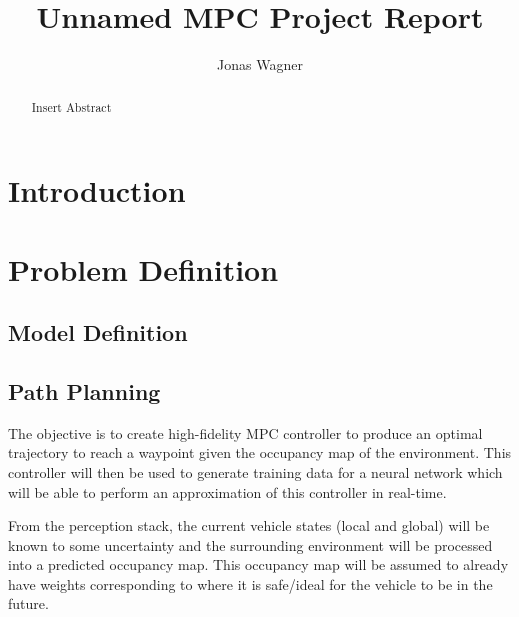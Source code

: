 \documentclass[]{IEEEtran}
\title{
    Unnamed MPC Project Report
}
\author{Jonas Wagner} %
\begin{document}
\maketitle
\begin{abstract}
    Insert Abstract
\end{abstract}




\section{Introduction}



\section{Problem Definition}
\label{sec:pblm_def}





\subsection{Model Definition}
\label{subsec:mdl_def}



\subsection{Path Planning}
\label{subsec:pathPlanning}

The objective is to create high-fidelity MPC controller to produce an optimal trajectory to reach a waypoint given the occupancy map of the environment.
This controller will then be used to generate training data for a neural network which will be able to perform an approximation of this controller in real-time.

From the perception stack, the current vehicle states (local and global) will be known to some uncertainty and the surrounding environment will be processed into a predicted occupancy map.
This occupancy map will be assumed to already have weights corresponding to where it is safe/ideal for the vehicle to be in the future.
\end{document}
